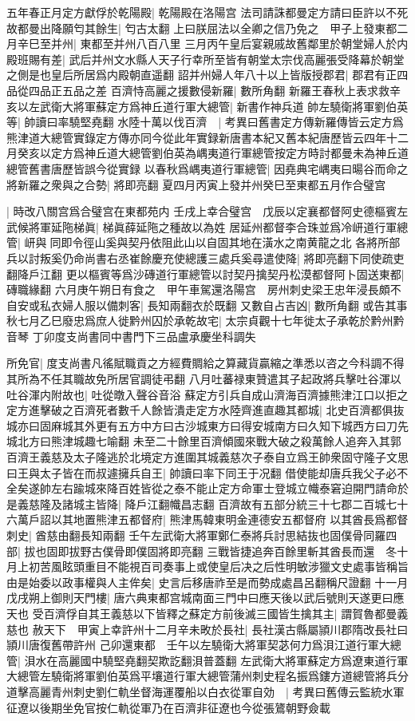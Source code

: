 五年春正月定方獻俘於乾陽殿|{
	乾陽殿在洛陽宫}
法司請誅都曼定方請曰臣許以不死故都曼出降願匄其餘生|{
	匄古太翻}
上曰朕屈法以全卿之信乃免之　甲子上發東都二月辛巳至并州|{
	東都至并州八百八里}
三月丙午皇后宴親戚故舊鄰里於朝堂婦人於内殿班賜有差|{
	武后并州文水縣人天子行幸所至皆有朝堂太宗伐高麗張受降幕於朝堂之側是也皇后所居爲内殿朝直遥翻}
詔并州婦人年八十以上皆版授郡君|{
	郡君有正四品從四品正五品之差}
百濟恃高麗之援數侵新羅|{
	數所角翻}
新羅王春秋上表求救辛亥以左武衛大將軍蘇定方爲神丘道行軍大總管|{
	新書作神兵道}
帥左驍衛將軍劉伯英等|{
	帥讀曰率驍堅堯翻}
水陸十萬以伐百濟　|{
	考異曰舊書定方傳新羅傳皆云定方爲熊津道大總管實錄定方傳亦同今從此年實録新唐書本紀又舊本紀唐歷皆云四年十二月癸亥以定方爲神丘道大總管劉伯英為嵎夷道行軍總管按定方時討都曼未為神丘道總管舊書唐歷皆誤今從實録}
以春秋爲嵎夷道行軍總管|{
	因堯典宅嵎夷曰暘谷而命之}
將新羅之衆與之合勢|{
	將即亮翻}
夏四月丙寅上發并州癸巳至東都五月作合璧宫

|{
	時改八關宫爲合璧宫在東都苑内}
壬戌上幸合璧宫　戊辰以定襄都督阿史德樞賓左武候將軍延陁梯眞|{
	梯眞薛延陁之種故以為姓}
居延州都督李合珠並爲冷岍道行軍總管|{
	岍與同即令徑山奚與契丹依阻此山以自固其地在潢水之南黄龍之北}
各將所部兵以討叛奚仍命尚書右丞崔餘慶充使總護三處兵奚尋遣使降|{
	將即亮翻下同使疏吏翻降戶江翻}
更以樞賓等爲沙磚道行軍總管以討契丹擒契丹松漠都督阿卜固送東都|{
	磚職緣翻}
六月庚午朔日有食之　甲午車駕還洛陽宫　房州刺史梁王忠年浸長頗不自安或私衣婦人服以備刺客|{
	長知兩翻衣於既翻}
又數自占吉凶|{
	數所角翻}
或告其事秋七月乙巳廢忠爲庶人徙黔州囚於承乾故宅|{
	太宗貞觀十七年徙太子承乾於黔州黔音琴}
丁卯度支尚書同中書門下三品盧承慶坐科調失

所免官|{
	度支尚書凡徭賦職貢之方經費賙給之算藏貨贏縮之準悉以咨之今科調不得其所為不任其職故免所居官調徒弔翻}
八月吐蕃禄東贊遣其子起政將兵擊吐谷渾以吐谷渾内附故也|{
	吐從暾入聲谷音浴}
蘇定方引兵自成山濟海百濟據熊津江口以拒之定方進擊破之百濟死者數千人餘皆潰走定方水陸齊進直趣其都城|{
	北史百濟都俱抜城亦曰固麻城其外更有五方中方曰古沙城東方曰得安城南方曰久知下城西方曰刀先城北方曰熊津城趣七喻翻}
未至二十餘里百濟傾國來戰大破之殺萬餘人追奔入其郭百濟王義慈及太子隆逃於北境定方進圍其城義慈次子泰自立爲王帥衆固守隆子文思曰王與太子皆在而叔遽擁兵自王|{
	帥讀曰率下同王于况翻}
借使能却唐兵我父子必不全矣遂帥左右踰城來降百姓皆從之泰不能止定方命軍士登城立幟泰窘迫開門請命於是義慈隆及諸城主皆降|{
	降戶江翻幟昌志翻}
百濟故有五部分統三十七郡二百城七十六萬戶詔以其地置熊津五都督府|{
	熊津馬韓東明金連德安五都督府}
以其酋長爲都督刺史|{
	酋慈由翻長知兩翻}
壬午左武衛大將軍鄭仁泰將兵討思結抜也固僕骨同羅四部|{
	拔也固即拔野古僕骨即僕固將即亮翻}
三戰皆捷追奔百餘里斬其酋長而還　冬十月上初苦風眩頭重目不能視百司奏事上或使皇后决之后性明敏涉獵文史處事皆稱旨由是始委以政事權與人主侔矣|{
	史言后移唐祚至是而勢成處昌呂翻稱尺證翻}
十一月戊戌朔上御則天門樓|{
	唐六典東都宫城南面三門中曰應天後以武后號則天遂更曰應天也}
受百濟俘自其王義慈以下皆釋之蘇定方前後滅三國皆生擒其主|{
	謂賀魯都曼義慈也}
赦天下　甲寅上幸許州十二月辛未畋於長社|{
	長社漢古縣屬頴川郡隋改長社曰頴川唐復舊帶許州}
己卯還東都　壬午以左驍衛大將軍契苾何力爲浿江道行軍大總管|{
	浿水在高麗國中驍堅堯翻契欺訖翻浿普蓋翻}
左武衛大將軍蘇定方爲遼東道行軍大總管左驍衛將軍劉伯英爲平壤道行軍大總管蒲州刺史程名振爲鏤方道總管將兵分道擊高麗青州刺史劉仁軌坐督海運覆船以白衣從軍自効　|{
	考異曰舊傳云監統水軍征遼以後期坐免官按仁軌從軍乃在百濟非征遼也今從張鷟朝野僉載}


